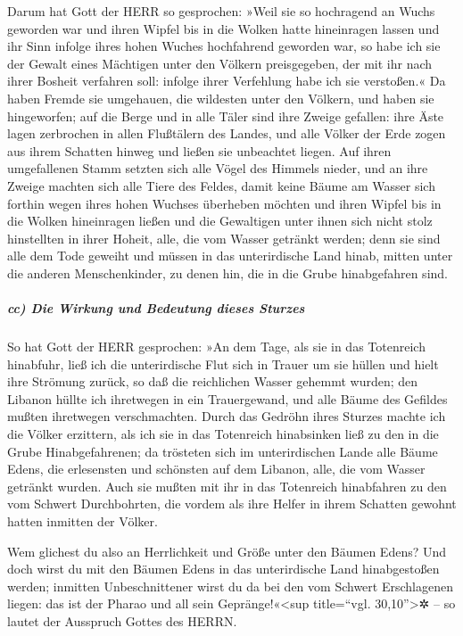 Darum hat Gott der HERR so gesprochen: »Weil sie so
hochragend an Wuchs geworden war und ihren Wipfel bis in die Wolken
hatte hineinragen lassen und ihr Sinn infolge ihres hohen Wuches
hochfahrend geworden war, so habe ich sie der Gewalt
eines Mächtigen unter den Völkern preisgegeben, der mit ihr nach ihrer
Bosheit verfahren soll: infolge ihrer Verfehlung habe ich sie
verstoßen.« Da haben Fremde sie umgehauen, die wildesten
unter den Völkern, und haben sie hingeworfen; auf die Berge und in alle
Täler sind ihre Zweige gefallen: ihre Äste lagen zerbrochen in allen
Flußtälern des Landes, und alle Völker der Erde zogen aus ihrem Schatten
hinweg und ließen sie unbeachtet liegen. Auf ihren
umgefallenen Stamm setzten sich alle Vögel des Himmels nieder, und an
ihre Zweige machten sich alle Tiere des Feldes, damit
keine Bäume am Wasser sich forthin wegen ihres hohen Wuchses überheben
möchten und ihren Wipfel bis in die Wolken hineinragen ließen und die
Gewaltigen unter ihnen sich nicht stolz hinstellten in ihrer Hoheit,
alle, die vom Wasser getränkt werden; denn sie sind alle dem Tode
geweiht und müssen in das unterirdische Land hinab, mitten unter die
anderen Menschenkinder, zu denen hin, die in die Grube hinabgefahren
sind.

\hypertarget{cc-die-wirkung-und-bedeutung-dieses-sturzes}{%
\subparagraph{cc) Die Wirkung und Bedeutung dieses
Sturzes}\label{cc-die-wirkung-und-bedeutung-dieses-sturzes}}

So hat Gott der HERR gesprochen: »An dem Tage, als sie in
das Totenreich hinabfuhr, ließ ich die unterirdische Flut sich in Trauer
um sie hüllen und hielt ihre Strömung zurück, so daß die reichlichen
Wasser gehemmt wurden; den Libanon hüllte ich ihretwegen in ein
Trauergewand, und alle Bäume des Gefildes mußten ihretwegen
verschmachten. Durch das Gedröhn ihres Sturzes machte ich
die Völker erzittern, als ich sie in das Totenreich hinabsinken ließ zu
den in die Grube Hinabgefahrenen; da trösteten sich im unterirdischen
Lande alle Bäume Edens, die erlesensten und schönsten auf dem Libanon,
alle, die vom Wasser getränkt wurden. Auch sie mußten mit
ihr in das Totenreich hinabfahren zu den vom Schwert Durchbohrten, die
vordem als ihre Helfer in ihrem Schatten gewohnt hatten inmitten der
Völker.

Wem glichest du also an Herrlichkeit und Größe unter den
Bäumen Edens? Und doch wirst du mit den Bäumen Edens in das
unterirdische Land hinabgestoßen werden; inmitten Unbeschnittener wirst
du da bei den vom Schwert Erschlagenen liegen: das ist der Pharao und
all sein Gepränge!«\textless sup title=``vgl. 30,10''\textgreater✲ -- so
lautet der Ausspruch Gottes des HERRN.


